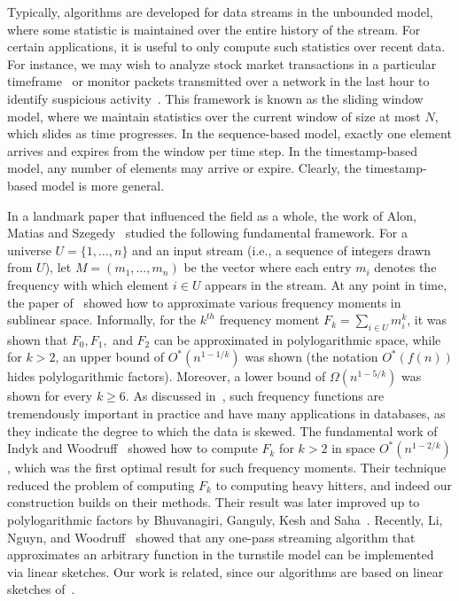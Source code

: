 \documentclass[11pt]{article}
\newcommand{\tbar}[1]{\mbox{\sbox0{#1}\sbox2{\~{}}\ooalign{\hidewidth\raise\dimexpr\ht0-\ht2+.3ex\box2 \hidewidth\cr#1\cr}}}
\begin{document}
Typically, algorithms are developed for data streams in the unbounded model, where some
statistic is maintained over the entire history of the stream.  For certain applications, it is useful
to only compute such statistics over recent data.  For instance, we may wish to analyze
stock market transactions in a particular timeframe~\cite{OMMGM02} or monitor packets
transmitted over a network in the last hour to identify suspicious activity~\cite{VSGB05}.
This framework is known as the sliding window model, where we maintain statistics
over the current window of size at most $N$, which slides as time progresses.  In the sequence-based model,
exactly one element arrives and expires from the window per time step.
In the timestamp-based model, any number of elements may arrive or expire.
Clearly, the timestamp-based model is more general.

In a landmark paper that influenced the field as a whole, the work of Alon, Matias and Szegedy~\cite{AMS96}
studied the following fundamental framework.
For a universe $U = \{1,\ldots,n\}$ and an input stream (i.e., a sequence of integers drawn from $U$),
let $M = (m_1,\ldots,m_n)$ be the vector where each entry $m_i$ denotes the frequency
with which element $i \in U$ appears in the stream.  At any point in time, the paper of~\cite{AMS96}
showed how to approximate various frequency moments in sublinear space.  Informally, for the $k^{th}$ frequency
moment $F_k = \sum_{i\in U} m_i^k$, it was shown that $F_0,F_1,$ and $F_2$ can be approximated in polylogarithmic space,
while for $k > 2$, an upper bound of $O^*(n^{1-{1/k}})$ was shown (the notation $O^*(f(n))$ hides polylogarithmic factors).
Moreover, a lower bound of $\Omega(n^{1-{5/k}})$ was shown for every $k \geq 6$.  As discussed in~\cite{AMS96},
such frequency functions are tremendously important in practice and have many applications in databases, as
they indicate the degree to which the data is skewed.
The fundamental work of Indyk and Woodruff~\cite{IW05} showed how to compute $F_k$ for $k>2$ in
space $O^*(n^{1-2/k})$, which was the first optimal result for such frequency moments.
Their technique reduced the problem of computing $F_k$ to computing heavy hitters, and indeed
our construction builds on their methods.
Their result was later improved up to polylogarithmic
factors by Bhuvanagiri, Ganguly, Kesh and Saha~\cite{BGKS06}.
Recently, Li, Nguy\tbar{\^e}n, and Woodruff~\cite{LNW14} showed that any one-pass streaming
algorithm that approximates an arbitrary function in the turnstile model can be implemented
via linear sketches.  Our work is related, since our algorithms are based on linear sketches
of~\cite{AMS96}.
\end{document}
